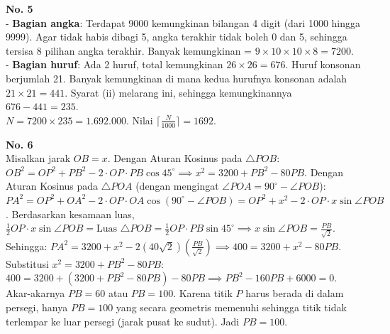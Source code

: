 \documentclass[11pt, a4paper]{article}
\begin{document}
\textbf{No. 5}\\
- \textbf{Bagian angka}: Terdapat 9000 kemungkinan bilangan 4 digit (dari 1000 hingga 9999). Agar tidak habis dibagi 5, angka terakhir tidak boleh 0 dan 5, sehingga tersisa 8 pilihan angka terakhir. Banyak kemungkinan = $9 \times 10 \times 10 \times 8 = 7200$. \\
- \textbf{Bagian huruf}: Ada 2 huruf, total kemungkinan $26 \times 26 = 676$. Huruf konsonan berjumlah 21. Banyak kemungkinan di mana kedua hurufnya konsonan adalah $21 \times 21 = 441$. Syarat (ii) melarang ini, sehingga kemungkinannya $676 - 441 = 235$.\\
$N = 7200 \times 235 = 1.692.000$. Nilai $\lceil \frac{N}{1000} \rceil = 1692$.

\textbf{No. 6}\\
Misalkan jarak $OB = x$. Dengan Aturan Kosinus pada $\triangle POB$:
$OB^2 = OP^2 + PB^2 - 2 \cdot OP \cdot PB \cos 45^\circ \implies x^2 = 3200 + PB^2 - 80PB$.
Dengan Aturan Kosinus pada $\triangle POA$ (dengan mengingat $\angle POA = 90^\circ - \angle POB$):
$PA^2 = OP^2 + OA^2 - 2 \cdot OP \cdot OA \cos(90^\circ - \angle POB) = OP^2 + x^2 - 2 \cdot OP \cdot x \sin \angle POB$.
Berdasarkan kesamaan luas, $\frac{1}{2} OP \cdot x \sin \angle POB = \text{Luas }\triangle POB = \frac{1}{2} OP \cdot PB \sin 45^\circ \implies x \sin \angle POB = \frac{PB}{\sqrt{2}}$.
Sehingga: $PA^2 = 3200 + x^2 - 2(40\sqrt{2})\left(\frac{PB}{\sqrt{2}}\right) \implies 400 = 3200 + x^2 - 80PB$.
Substitusi $x^2 = 3200 + PB^2 - 80PB$:
$400 = 3200 + (3200 + PB^2 - 80PB) - 80PB \implies PB^2 - 160PB + 6000 = 0$.
Akar-akarnya $PB = 60$ atau $PB = 100$. Karena titik $P$ harus berada di dalam persegi, hanya $PB = 100$ yang secara geometris memenuhi sehingga titik tidak terlempar ke luar persegi (jarak pusat ke sudut). Jadi $PB = 100$.

\begin{center}
\end{center}
\end{document}
